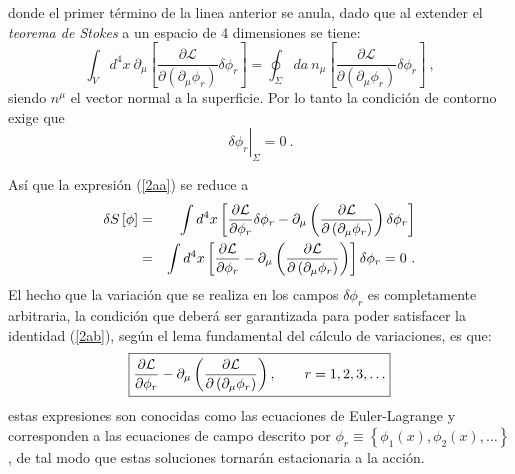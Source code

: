 \noindent
donde el primer término de la linea anterior se anula, dado que al extender el \emph{teorema de Stokes} a un espacio de 4 dimensiones se tiene:
\begin{equation}
\int_{V}d^{4}x~\partial _{\mu }\left[ \frac{\partial \mathcal{L}}{\partial
\left( \partial _{\mu }\phi _{r}\right) }\delta \phi _{r}\right]
=\oint_{\Sigma }da~n_{\mu }\left[ \frac{\partial \mathcal{L}}{\partial \left(
\partial _{\mu }\phi _{r}\right) }\delta \phi _{r}\right]~, 
\end{equation}
siendo $n^{\mu}$ el vector normal a la superficie. Por lo tanto la condición de contorno exige que
\begin{equation*}
\left. \frac{{}}{{}}\delta \phi_{r} \right\vert _{\Sigma }=0~.
\end{equation*}

\noindent
Así que la expresión (\ref{2aa}) se reduce a 
\begin{eqnarray}
\delta S\left[ \phi \right]  &=&\int d^{4}x\left[ \frac{\partial \mathcal{L}%
}{\partial \phi _{r}}\delta \phi _{r}-\partial _{\mu }\left( \frac{\partial 
\mathcal{L}}{\partial \left( \partial _{\mu }\phi _{r}\right) }\right)
\delta \phi _{r}\right] \notag \\
&=&\int d^{4}x\left[ \frac{\partial \mathcal{L}}{\partial \phi _{r}}%
-\partial _{\mu }\left( \frac{\partial \mathcal{L}}{\partial \left( \partial
_{\mu }\phi _{r}\right) }\right) \right] \delta \phi _{r}=0~. \label{2ab}
\end{eqnarray}
\noindent
El hecho que la variación que se realiza en los campos $\delta \phi_{r}$ es completamente arbitraria, la condición que deberá ser garantizada para poder satisfacer la identidad (\ref{2ab}), según el lema fundamental del cálculo de variaciones, es que:
\begin{equation}
\boxed{
\frac{\partial \mathcal{L}}{\partial \phi _{r}}-\partial _{\mu }\left( \frac{%
\partial \mathcal{L}}{\partial \left( \partial _{\mu }\phi _{r}\right) }%
\right), \quad\quad r=1,2,3,\ldots 
\label{elagrange}
}
\end{equation}
estas expresiones son conocidas como las ecuaciones de Euler-Lagrange y corresponden a las ecuaciones de campo descrito por $\phi_{r}\equiv \left\{\phi_{1}(x),\phi_{2}(x),\ldots\right\}$, de tal modo que estas soluciones tornarán estacionaria a la acción.


